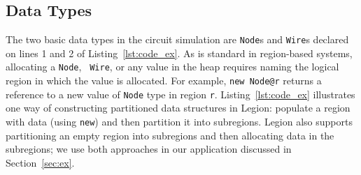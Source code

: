   





\subsection{Data Types}
\label{subsec:datatypes}
The two basic data types in the circuit simulation are {\tt Node}s and
{\tt Wire}s declared on lines 1 and 2 of Listing~\ref{lst:code_ex}.
As is standard in region-based systems, allocating a {\tt Node}, {\tt
  Wire}, or any value in the heap requires naming the logical region
in which the value is allocated.  For example, {\tt new Node@r} returns
a reference to a new value of {\tt Node} type in region {\tt r}.  
Listing~\ref{lst:code_ex} illustrates one way of constructing partitioned
data structures in Legion: populate a region with data (using {\tt new}) and then partition it
into subregions.  Legion also supports partitioning an empty region into subregions
and then allocating data in the subregions; we use both approaches in our
application discussed in Section~\ref{sec:ex}.


